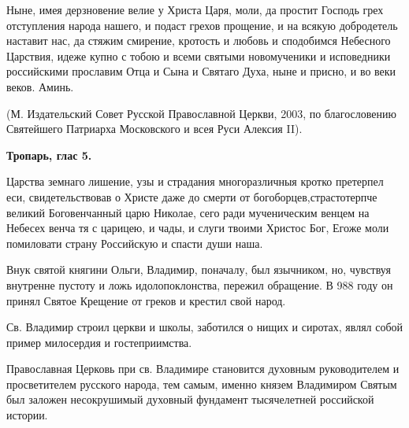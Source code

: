 Ныне, имея дерзновение велие у Христа Царя, моли, да простит Господь грех отступления народа нашего, и подаст грехов прощение, и на всякую добродетель наставит нас, да стяжим смирение, кротость и любовь и сподобимся Небесного Царствия, идеже купно с тобою и всеми святыми новомученики и исповедники российскими прославим Отца и Сына и Святаго Духа, ныне и присно, и во веки веков. Аминь.

(М. Издательский Совет Русской Православной Церкви, 2003, по благословению Святейшего Патриарха Московского и всея Руси Алексия II).
\mychapterending

 


\bfseries Тропарь, глас 5.\normalfont{}\bfseries 


Царства земнаго лишение, узы и страдания многоразличныя кротко претерпел еси, свидетельствовав о Христе даже до смерти от богоборцев,страстотерпче великий Боговенчанный царю Николае, сего ради мученическим венцем на Небесех венча тя с царицею, и чады, и слуги твоими Христос Бог, Егоже моли помиловати страну Российскую и спасти души наша.\normalfont{}
\mychapterending

 
Внук святой княгини Ольги, Владимир, поначалу, был язычником, но, чувствуя внутренне пустоту и ложь идолопоклонства, пережил обращение. В 988 году он принял Святое Крещение от греков и крестил свой народ. 


Св. Владимир строил церкви и школы, заботился о нищих и сиротах, являл собой пример милосердия и гостеприимства. 


Православная Церковь при св. Владимире становится духовным руководителем и просветителем русского народа, тем самым, именно князем Владимиром Святым был заложен несокрушимый духовный фундамент тысячелетней российской истории.




